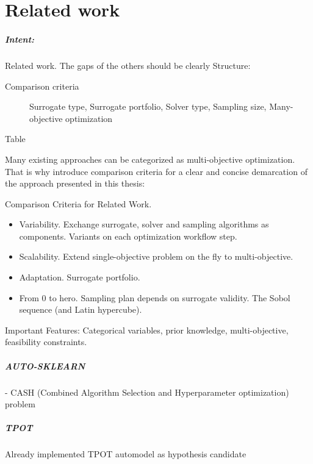 \chapter{Related work}\label{sec:related}

    \begin{blockquote}
        \paragraph{Intent:} Related work. The gaps of the others should be clearly
        Structure:
        \begin{description}

            \item[Comparison criteria] Surrogate type, Surrogate portfolio, Solver type, Sampling size, Many-objective optimization
            \item[Table] 
        \end{description}
    \end{blockquote}



    Many existing approaches can be categorized as multi-objective optimization. That is why
    introduce comparison criteria for a clear and concise demarcation of the approach presented in this thesis:

    Comparison Criteria for Related Work. 
    \begin{itemize}
        \item Variability. Exchange surrogate, solver and sampling algorithms as components. Variants on each optimization workflow step.
        \item Scalability. Extend single-objective problem on the fly to multi-objective.
        \item Adaptation. Surrogate portfolio.
        \item From 0 to hero. Sampling plan depends on surrogate validity. The Sobol sequence (and Latin hypercube).                
    \end{itemize}
    Important Features: Categorical variables, prior knowledge, multi-objective, feasibility constraints.

    \paragraph{AUTO-SKLEARN} \cite{autosklearn:feurer2015efficient}
    - CASH (Combined Algorithm Selection and Hyperparameter optimization) problem

    \paragraph{TPOT} \cite{OlsonGECCO2016}
    Already implemented TPOT automodel as hypothesis candidate

